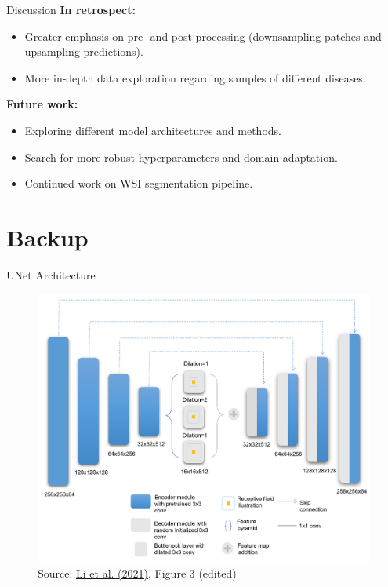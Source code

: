 \documentclass{beamer}
\begin{document}
\begin{frame}{Discussion}
    \textbf{In retrospect:}
    \begin{itemize}
        \item Greater emphasis on pre- and post-processing (downsampling patches and upsampling predictions).
        \item More in-depth data exploration regarding samples of different diseases.
    \end{itemize}

    \vspace{0.5cm}

    \textbf{Future work:}
    \begin{itemize}
        \item Exploring different model architectures and methods.
        \item Search for more robust hyperparameters and domain adaptation.
        \item Continued work on WSI segmentation pipeline.
    \end{itemize}
\end{frame}

\appendix

\section{Backup}

\begin{frame}{UNet Architecture}
    \begin{figure}
        \centering
        \includegraphics[height=0.7\textheight]{Images/UNetArchitecture.png}
        \caption{Source: \href{https://doi.org/10.1117/1.JMI.8.6.067501}{Li et al. (2021)}, Figure 3 (edited)}
    \end{figure}
\end{frame}
\end{document}
